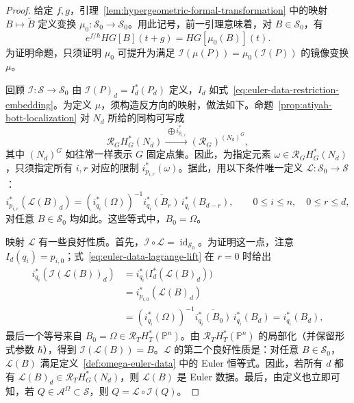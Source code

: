 \begin{proof}
给定 $f,g$，引理~\ref{lem:hypergeometric-formal-transformation} 中的映射 $B\mapsto\widetilde B$ 定义变换 $\mu_0:\mathcal S_0\to\mathcal S_0$。用此记号，前一引理意味着，对 $B\in\mathcal S_0$，有
\[
e^{f/\hbar}HG[B](t+g)=HG[\mu_0(B)](t).
\]
为证明命题，只须证明 $\mu_0$ 可提升为满足 $\mathcal I(\mu(P))=\mu_0(\mathcal I(P))$ 的镜像变换 $\mu$。

回顾 $\mathcal I:\mathcal S\to\mathcal S_0$ 由 $\mathcal I(P)_d=I_d^*(P_d)$ 定义，$I_d$ 如式~\eqref{eq:euler-data-restriction-embedding}。为定义 $\mu$，须构造反方向的映射，做法如下。命题~\ref{prop:atiyah-bott-localization} 对 $N_d$ 所给的同构可写成
\[
\mathcal R_GH_G^*(N_d)\xrightarrow{\ \bigoplus i_{p_{i,r}}^*\ }
(\mathcal R_G)^{(N_d)^G},
\]
其中 $(N_d)^G$ 如往常一样表示 $G$ 固定点集。因此，为指定元素 $\omega\in\mathcal R_GH_G^*(N_d)$，只须指定所有 $i,r$ 对应的限制 $i_{p_{i,r}}^*(\omega)$。据此，用以下条件唯一定义 $\mathcal L:\mathcal S_0\to\mathcal S$：
\begin{equation}\label{eq:euler-data-lagrange-lift}
i_{p_{i,r}}^*(\mathcal L(B)_d)
=(i_{q_i}^*(\Omega))^{-1}\overline{i_{q_i}^*(B_r)}\,i_{q_i}^*(B_{d-r}),
\qquad0\le i\le n,\quad0\le r\le d,
\end{equation}
对任意 $B\in\mathcal S_0$ 均如此。这些等式中，$B_0=\Omega$。

映射 $\mathcal L$ 有一些良好性质。首先，$\mathcal I\circ\mathcal L=\operatorname{id}_{\mathcal S_0}$。为证明这一点，注意 $I_d(q_i)=p_{i,0}$；式~\eqref{eq:euler-data-lagrange-lift} 在 $r=0$ 时给出
\[
\begin{aligned}
i_{q_i}^*(\mathcal I(\mathcal L(B))_d)
&=i_{q_i}^*\bigl(I_d^*(\mathcal L(B)_d)\bigr)\\
&=i_{p_{i,0}}^*(\mathcal L(B)_d)\\
&=(i_{q_i}^*(\Omega))^{-1}\overline{i_{q_i}^*(B_0)}\,i_{q_i}^*(B_d)
=i_{q_i}^*(B_d),
\end{aligned}
\]
最后一个等号来自 $B_0=\Omega\in\mathcal R_TH_T^*(\mathbb P^n)$。由 $\mathcal R_TH_T^*(\mathbb P^n)$ 的局部化（并保留形式参数 $\hbar$），得到 $\mathcal I(\mathcal L(B))=B$。$\mathcal L$ 的第二个良好性质是：对任意 $B\in\mathcal S_0$，$\mathcal L(B)$ 满足定义~\ref{def:omega-euler-data} 中的 Euler 恒等式。因此，若所有 $d$ 都有 $\mathcal L(B)_d\in\mathcal R_TH_G^*(N_d)$，则 $\mathcal L(B)$ 是 Euler 数据。最后，由定义也立即可知，若 $Q\in\mathcal A^\Omega\subset\mathcal S$，则 $Q=\mathcal L\circ\mathcal I(Q)$。


\end{proof}
